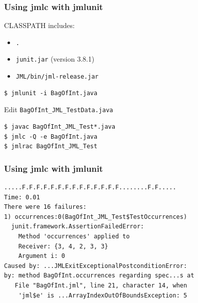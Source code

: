 \begin{frame}[fragile]
\frametitle{Using jmlc with jmlunit}

\begin{example}
CLASSPATH includes:
\begin{itemize}
\item
\texttt{.}

\item
\texttt{junit.jar} (version 3.8.1)

\item
\texttt{JML/bin/jml-release.jar}
\end{itemize}

\begin{verbatim}
$ jmlunit -i BagOfInt.java
\end{verbatim}

Edit \lstinline!BagOfInt_JML_TestData.java!

\begin{verbatim}
$ javac BagOfInt_JML_Test*.java
$ jmlc -Q -e BagOfInt.java
$ jmlrac BagOfInt_JML_Test
\end{verbatim}
\end{example}
\end{frame}

\begin{frame}[fragile]
\frametitle{Using jmlc with jmlunit}

{\small
\begin{verbatim}
.....F.F.F.F.F.F.F.F.F.F.F.F.F.F........F.F.....
Time: 0.01
There were 16 failures:
1) occurrences:0(BagOfInt_JML_Test$TestOccurrences)
  junit.framework.AssertionFailedError:
    Method 'occurrences' applied to
    Receiver: {3, 4, 2, 3, 3}
    Argument i: 0
Caused by: ...JMLExitExceptionalPostconditionError:
by: method BagOfInt.occurrences regarding spec...s at
   File "BagOfInt.jml", line 21, character 14, when
    'jml$e' is ...ArrayIndexOutOfBoundsException: 5
\end{verbatim}
}
\end{frame}

